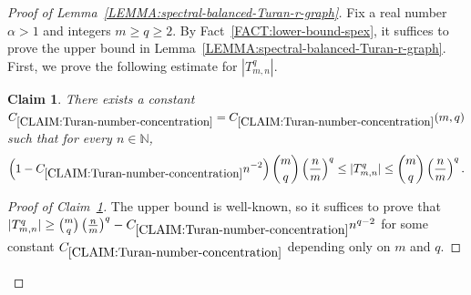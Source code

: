 \documentclass[11pt,a4paper]{article}
\newtheorem{claim}[definition]{Claim}
\begin{document}
\begin{proof}[Proof of Lemma~\ref{LEMMA:spectral-balanced-Turan-r-graph}]
    Fix a real number $\alpha > 1$ and integers $m \ge q \ge 2$. 
    By Fact~\ref{FACT:lower-bound-spex}, it suffices to prove the upper bound in Lemma~\ref{LEMMA:spectral-balanced-Turan-r-graph}. 
    First, we prove the following estimate for $|T_{m,n}^{q}|$.
    \begin{claim}\label{CLAIM:Turan-number-concentration}
        There exists a constant $C_{\ref{CLAIM:Turan-number-concentration}} = C_{\ref{CLAIM:Turan-number-concentration}}(m,q)$ such that for every $n \in \mathbb{N}$, 
        \begin{align*}
            \left( 1- C_{\ref{CLAIM:Turan-number-concentration}} n^{-2} \right)\binom{m}{q}\left(\frac{n}{m}\right)^q 
            \le |T_{m,n}^{q}| 
            \le \binom{m}{q}\left(\frac{n}{m}\right)^q. 
        \end{align*}
    \end{claim}
    \begin{proof}[Proof of Claim~\ref{CLAIM:Turan-number-concentration}]
        The upper bound is well-known, so it suffices to prove that $|T_{m,n}^{q}| \ge \binom{m}{q}\left(\frac{n}{m}\right)^q - C_{\ref{CLAIM:Turan-number-concentration}} n^{q-2}$ for some constant $C_{\ref{CLAIM:Turan-number-concentration}}$ depending only on $m$ and $q$. 
        

\end{proof}
\end{proof}
\end{document}
